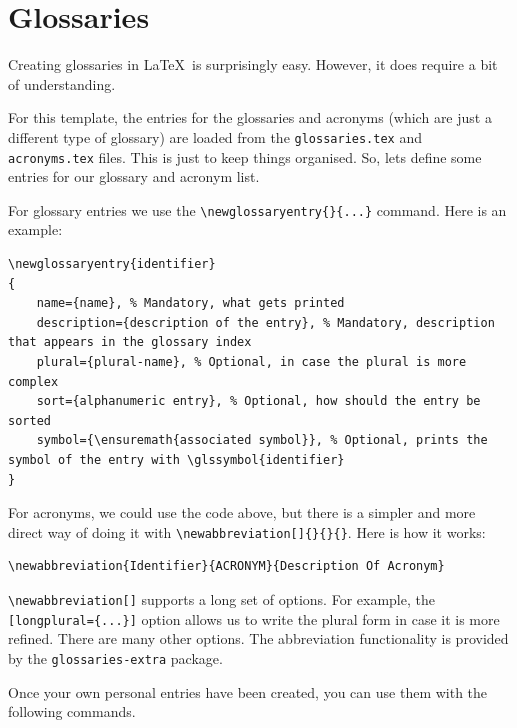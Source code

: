 \FloatBarrier

\section{Glossaries}\label{sec:glossaries}

Creating glossaries in \LaTeX\ is surprisingly easy. However, it does require a bit of understanding.

For this template, the entries for the glossaries and acronyms (which are just a different type of glossary) are loaded from the \texttt{glossaries.tex} and \texttt{acronyms.tex} files. This is just to keep things organised. So, lets define some entries for our glossary and acronym list.

For glossary entries we use the \verb|\newglossaryentry{}{...}| command. Here is an example:

\begin{lstlisting}[language={[LaTeX]TeX}]
\newglossaryentry{identifier}
{
	name={name}, % Mandatory, what gets printed
	description={description of the entry}, % Mandatory, description that appears in the glossary index
	plural={plural-name}, % Optional, in case the plural is more complex
	sort={alphanumeric entry}, % Optional, how should the entry be sorted
	symbol={\ensuremath{associated symbol}}, % Optional, prints the symbol of the entry with \glssymbol{identifier}
}
\end{lstlisting}

For acronyms, we could use the code above, but there is a simpler and more direct way of doing it with \verb|\newabbreviation[]{}{}{}|. Here is how it works:

\begin{lstlisting}[language={[LaTeX]TeX}]
\newabbreviation{Identifier}{ACRONYM}{Description Of Acronym}
\end{lstlisting}

\verb|\newabbreviation[]| supports a long set of options. For example, the \verb|[longplural={...}]| option allows us to write the plural form in case it is more refined. There are many other options. The abbreviation functionality is provided by the \verb|glossaries-extra| package.

Once your own personal entries have been created, you can use them with the following commands.


